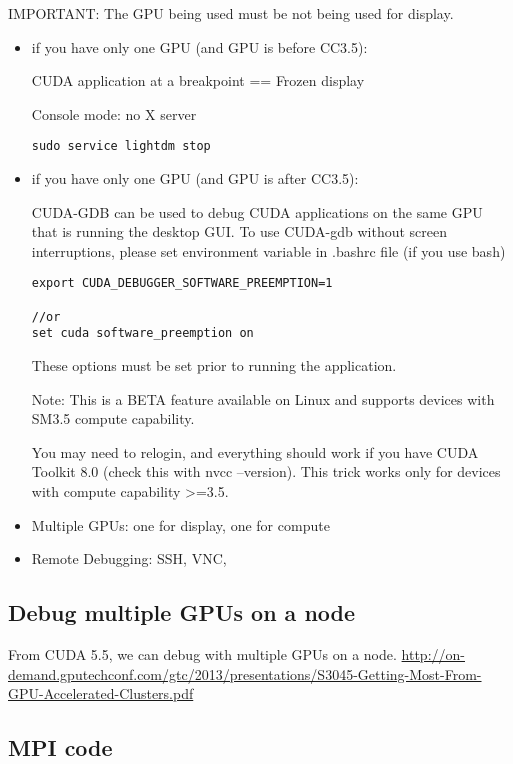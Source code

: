 IMPORTANT: The GPU being used must be not being used for display. 
\begin{itemize}
  \item if you have only one GPU (and GPU is before CC3.5): 
  
  CUDA application at a breakpoint == Frozen display
  
Console mode: no X server
\begin{verbatim}
sudo service lightdm stop
\end{verbatim}

  \item if you have only one GPU (and GPU is after CC3.5): 

CUDA-GDB can be used to debug CUDA applications on the same GPU that is running the desktop GUI.
To use CUDA-gdb without screen interruptions, please set environment variable in .bashrc file (if you use bash)
\begin{verbatim}
export CUDA_DEBUGGER_SOFTWARE_PREEMPTION=1

//or
set cuda software_preemption on
\end{verbatim}
These options must be set prior to running the application. 

Note: This is a BETA feature available on Linux and supports devices with SM3.5 compute capability.

You may need to relogin, and everything should work if you have CUDA Toolkit 8.0
(check this with nvcc --version). This trick works only for devices with compute
capability >=3.5.


  \item Multiple GPUs: one for display, one for compute
  
  \item Remote Debugging: SSH, VNC,
\end{itemize}

\subsection{Debug multiple GPUs on a node}

From CUDA 5.5, we can debug with multiple GPUs on a node.
\url{http://on-demand.gputechconf.com/gtc/2013/presentations/S3045-Getting-Most-From-GPU-Accelerated-Clusters.pdf}


\subsection{MPI code}

